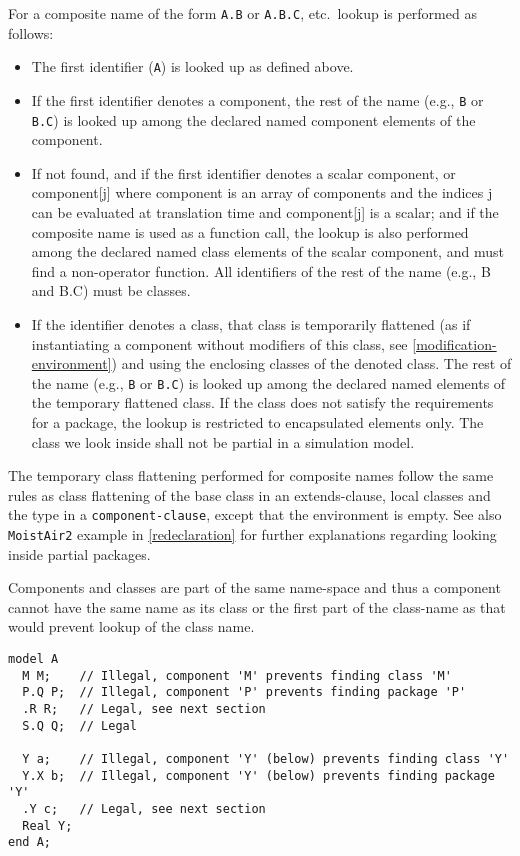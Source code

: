 For a composite name of the form \lstinline!A.B! or \lstinline!A.B.C!, etc.\ lookup is performed as follows:
\begin{itemize}
\item
  The first identifier (\lstinline!A!) is looked up as defined above.
\item
  If the first identifier denotes a component, the rest of the name
  (e.g., \lstinline!B! or \lstinline!B.C!) is looked up among the declared named component
  elements of the component.
\item
  If not found, and if the first identifier denotes a scalar component,
  or component[j] where component is an array of components and the
  indices j can be evaluated at translation time and component[j] is
  a scalar; and if the composite name is used as a function call, the
  lookup is also performed among the declared named class elements of
  the scalar component, and must find a non-operator function. All
  identifiers of the rest of the name (e.g., B and B.C) must be
  classes.
\item
  If the identifier denotes a class, that class is temporarily flattened (as if instantiating a component without modifiers of this class, see \cref{modification-environment}) and using the enclosing classes of the denoted class.
  The rest of the name (e.g., \lstinline!B! or \lstinline!B.C!) is looked up among the declared named elements of the temporary flattened class.
  If the class does not satisfy the requirements for a package, the lookup is restricted to encapsulated elements only.
  The class we look inside shall not be partial in a simulation model.
\end{itemize}

\begin{nonnormative}
The temporary class flattening performed for composite names follow the same rules as class flattening of the base class in an extends-clause, local classes and the type in a \lstinline[language=grammar]!component-clause!, except that the environment is empty.
See also \lstinline!MoistAir2! example in \cref{redeclaration} for further explanations regarding looking inside partial packages.
\end{nonnormative}
\begin{example}
Components and classes are part of the same name-space and thus a component cannot
have the same name as its class or the first part of the class-name as that
would prevent lookup of the class name.
\begin{lstlisting}[language=modelica]
model A
  M M;    // Illegal, component 'M' prevents finding class 'M'
  P.Q P;  // Illegal, component 'P' prevents finding package 'P'
  .R R;   // Legal, see next section
  S.Q Q;  // Legal

  Y a;    // Illegal, component 'Y' (below) prevents finding class 'Y'
  Y.X b;  // Illegal, component 'Y' (below) prevents finding package 'Y'
  .Y c;   // Legal, see next section
  Real Y;
end A;
\end{lstlisting}
\end{example}

